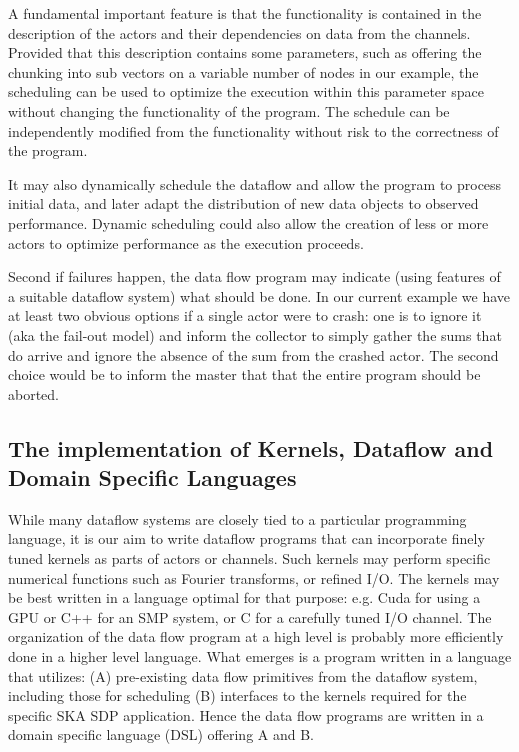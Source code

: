 \documentclass[11pt,a4paper]{article}
\begin{document}
A fundamental important feature is that the functionality is contained in the description of the actors and their dependencies on data from the channels.  Provided that this description contains some parameters, such as offering the chunking into sub vectors on a variable number of nodes in our example, the scheduling can be used to optimize the execution within this parameter space without changing the functionality of the program.  The schedule can be independently modified from the functionality without risk to the correctness of the program.

It may also dynamically schedule the dataflow and allow the program to process initial data, and later adapt the distribution of new data objects to observed performance.  Dynamic scheduling could also allow the creation of less or more actors to optimize performance as the execution proceeds. 

Second if failures happen, the data flow program may indicate (using features of a suitable dataflow system) what should be done.   In our current example we have at least two obvious options if a single actor were to crash: one is to ignore it (aka the fail-out model) and inform the collector to simply gather the sums that do arrive and ignore the absence of the sum from the crashed actor.  The second choice would be to inform the master that that the entire program should be aborted.

\subsection{The implementation of Kernels, Dataflow and Domain Specific Languages}

While many dataflow systems are closely tied to a particular programming language, it is our aim to write dataflow programs that can incorporate finely tuned kernels as parts of actors or channels.  Such kernels may perform specific numerical functions such as Fourier transforms, or refined I/O. The kernels may be best written in a language optimal for that purpose: e.g. Cuda for using a GPU or C++ for an SMP system, or C for a carefully tuned I/O channel. 
The organization of the data flow program at a high level is probably more efficiently done in a higher level language.
What emerges is a program written in a language that utilizes:
(A) pre-existing data flow primitives from the dataflow system, including those for scheduling
(B) interfaces to the kernels required for the specific SKA SDP application.
Hence the data flow programs are written in a domain specific language (DSL) offering A and B. 
\end{document}
